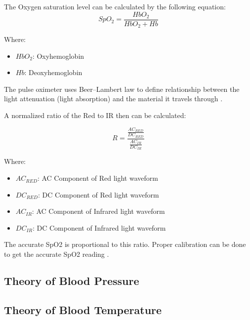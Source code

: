 The Oxygen saturation level can be calculated by the following equation:
\begin{equation}
	SpO_2=\frac{HbO_2}{HbO_2 + Hb}
\end{equation}

Where: \\
\begin{itemize}
	\item $HbO_2$: Oxyhemoglobin
	\item $Hb$: Deoxyhemoglobin
\end{itemize}

The pulse oximeter uses Beer–Lambert law \cite{george4} \cite{george5} to define relationship between the light attenuation (light absorption) and the material it travels through \cite{george7}.
  
A normalized ratio of the Red to IR then can be calculated:

\begin{equation}
	R = \frac{\frac{AC_{RED}}{DC_{RED}}}{\frac{AC_{IR}}{DC_{IR}}}
\end{equation}

Where: \\
\begin{itemize}
	\item $AC_{RED}$: AC Component of Red light waveform
	\item $DC_{RED}$: DC Component of Red light waveform
	\item $AC_{IR}$: AC Component of Infrared light waveform
	\item $DC_{IR}$: DC Component of Infrared light waveform
\end{itemize}

The accurate SpO2 is proportional to this ratio. Proper calibration can be done to get the accurate SpO2 reading \cite{george10}.

\subsection{Theory of Blood Pressure}

\subsection{Theory of Blood Temperature}
